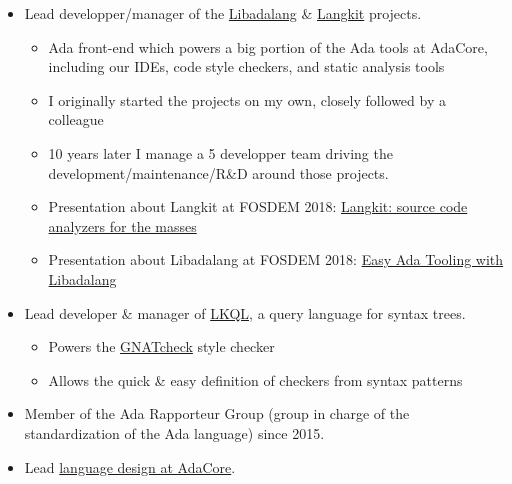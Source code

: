 \documentclass[10pt,letterpaper]{article}
\providecommand{\tightlist}{%
  \setlength{\itemsep}{0pt}\setlength{\parskip}{0pt}}
\begin{document}
\begin{itemize}
\item
  Lead developper/manager of the
  \href{https://github.com/AdaCore/libadalang}{Libadalang} \&
  \href{https://github.com/AdaCore/libadalang}{Langkit} projects.

  \begin{itemize}
  \tightlist
  \item
    Ada front-end which powers a big portion of the Ada tools at
    AdaCore, including our IDEs, code style checkers, and static
    analysis tools
  \item
    I originally started the projects on my own, closely followed by a
    colleague
  \item
    10 years later I manage a 5 developper team driving the
    development/maintenance/R\&D around those projects.
  \item
    Presentation about Langkit at FOSDEM 2018:
    \href{https://archive.fosdem.org/2018/schedule/event/code_reviving_the_meta_compiler_dream/}{Langkit:
    source code analyzers for the masses}
  \item
    Presentation about Libadalang at FOSDEM 2018:
    \href{https://archive.fosdem.org/2018/schedule/event/ada_tooling/}{Easy
    Ada Tooling with Libadalang}
  \end{itemize}
\item
  Lead developer \& manager of
  \href{https://github.com/AdaCore/langkit-query-language}{LKQL}, a
  query language for syntax trees.

  \begin{itemize}
  \tightlist
  \item
    Powers the
    \href{https://www.adacore.com/static-analysis/gnatcheck}{GNATcheck}
    style checker
  \item
    Allows the quick \& easy definition of checkers from syntax patterns
  \end{itemize}
\item
  Member of the Ada Rapporteur Group (group in charge of the
  standardization of the Ada language) since 2015.
\item
  Lead \href{https://github.com/AdaCore/ada-spark-rfcs/}{language design
  at AdaCore}.


\end{itemize}
\end{document}
